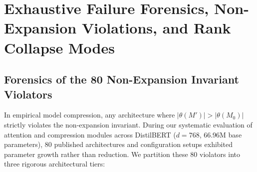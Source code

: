 \documentclass{article}
\begin{document}
\section{Exhaustive Failure Forensics, Non-Expansion Violations, and Rank Collapse Modes}
\label{app:failure_forensics}

\subsection{Forensics of the 80 Non-Expansion Invariant Violators}
\label{app:non_expansion_80}
In empirical model compression, any architecture where $|\theta(M')| > |\theta(M_0)|$ strictly violates the non-expansion invariant. During our systematic evaluation of attention and compression modules across DistilBERT ($d=768$, 66.96M base parameters), 80 published architectures and configuration setups exhibited parameter growth rather than reduction. We partition these 80 violators into three rigorous architectural tiers:
\end{document}
